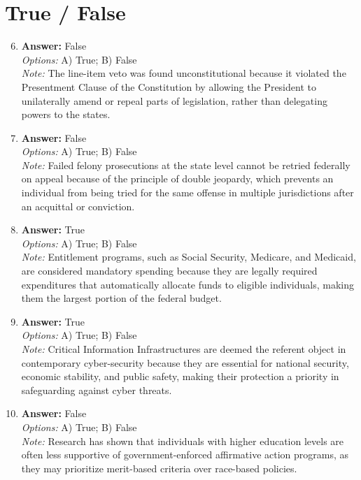\documentclass[12pt]{article}
\begin{document}
\section*{True / False}
\begin{enumerate}[label=\arabic*.]
\setcounter{enumi}{5}
\item \textbf{Answer:} False
\\ \textit{Options:} A) True; B) False
\\ \textit{Note:} The line-item veto was found unconstitutional because it violated the Presentment Clause of the Constitution by allowing the President to unilaterally amend or repeal parts of legislation, rather than delegating powers to the states.
\item \textbf{Answer:} False
\\ \textit{Options:} A) True; B) False
\\ \textit{Note:} Failed felony prosecutions at the state level cannot be retried federally on appeal because of the principle of double jeopardy, which prevents an individual from being tried for the same offense in multiple jurisdictions after an acquittal or conviction.
\item \textbf{Answer:} True
\\ \textit{Options:} A) True; B) False
\\ \textit{Note:} Entitlement programs, such as Social Security, Medicare, and Medicaid, are considered mandatory spending because they are legally required expenditures that automatically allocate funds to eligible individuals, making them the largest portion of the federal budget.
\item \textbf{Answer:} True
\\ \textit{Options:} A) True; B) False
\\ \textit{Note:} Critical Information Infrastructures are deemed the referent object in contemporary cyber-security because they are essential for national security, economic stability, and public safety, making their protection a priority in safeguarding against cyber threats.
\item \textbf{Answer:} False
\\ \textit{Options:} A) True; B) False
\\ \textit{Note:} Research has shown that individuals with higher education levels are often less supportive of government-enforced affirmative action programs, as they may prioritize merit-based criteria over race-based policies.
\end{enumerate}
\end{document}
